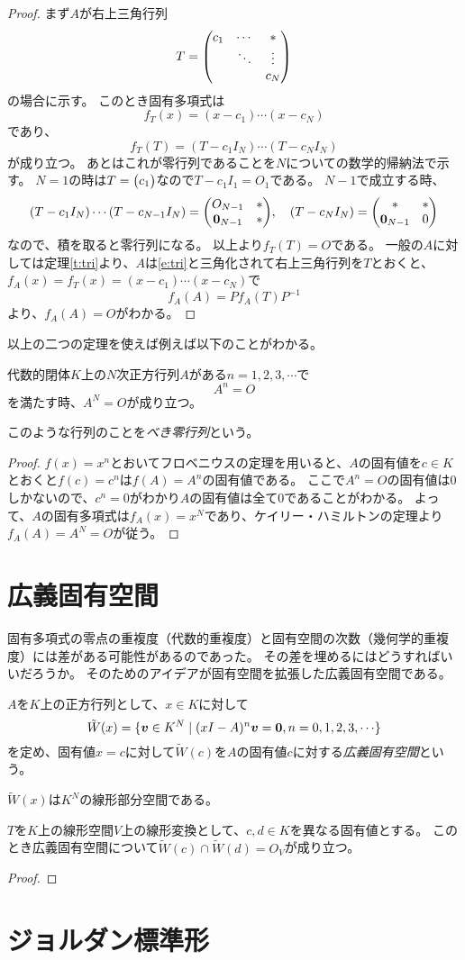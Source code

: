 \begin{proof}
まず$A$が右上三角行列
$$
T = \mqty(c_1 & \cdots & * \\ & \ddots & \vdots \\ & & c_N)
$$
の場合に示す。
このとき固有多項式は
$$
f_T(x) = (x-c_1)\cdots(x-c_N)
$$
であり、
$$
f_T(T) = (T-c_1 I_N)\cdots(T-c_N I_N)
$$
が成り立つ。
あとはこれが零行列であることを$N$についての数学的帰納法で示す。
$N = 1$の時は$T = \mqty(c_1)$なので$T-c_1 I_1 = O_1$である。
$N-1$で成立する時、
$$
(T-c_1 I_N)\cdots(T-c_{N-1} I_N) = \mqty(O_{N-1} & * \\ \vb*{0}_{N-1} & *),
\quad (T-c_N I_N) = \mqty(* & * \\ \vb*{0}_{N-1} & 0)
$$
なので、積を取ると零行列になる。
以上より$f_T(T) = O$である。
一般の$A$に対しては定理\ref{t:tri}より、$A$は\eqref{e:tri}と三角化されて右上三角行列を$T$とおくと、
$f_A(x) = f_T(x) = (x-c_1)\cdots(x-c_N)$で
$$
f_A(A) = P f_A(T) P^{-1}
$$
より、$f_A(A) = O$がわかる。
\end{proof}

以上の二つの定理を使えば例えば以下のことがわかる。

\begin{proposition}[べき零行列]
代数的閉体$K$上の$N$次正方行列$A$がある$n = 1, 2, 3, \cdots$で
$$
A^n = O
$$
を満たす時、$A^N = O$が成り立つ。
\end{proposition}

このような行列のことを\emph{べき零行列}という。

\begin{proof}
$f(x) = x^n$とおいてフロベニウスの定理を用いると、$A$の固有値を$c \in K$とおくと$f(c) = c^n$は$f(A) = A^n$の固有値である。
ここで$A^n = O$の固有値は$0$しかないので、$c^n = 0$がわかり$A$の固有値は全て$0$であることがわかる。
よって、$A$の固有多項式は$f_A(x) = x^N$であり、ケイリー・ハミルトンの定理より$f_A(A) = A^N = O$が従う。
\end{proof}

\section{広義固有空間}

固有多項式の零点の重複度（代数的重複度）と固有空間の次数（幾何学的重複度）には差がある可能性があるのであった。
その差を埋めるにはどうすればいいだろうか。
そのためのアイデアが固有空間を拡張した広義固有空間である。

\begin{definition}[広義固有空間]
$A$を$K$上の正方行列として、$x \in K$に対して
$$
\tilde{W}(x) = \lrset{ \vb*{v} \in K^N \mid (x I-A)^n\vb*{v} = \vb*{0}, n = 0, 1, 2, 3, \cdots }
$$
を定め、固有値$x = c$に対して$\tilde{W}(c)$を$A$の固有値$c$に対する\emph{広義固有空間}という。
\end{definition}

$\tilde{W}(x)$は$K^N$の線形部分空間である。

\begin{lemma}[広義固有空間の線形独立性]
$T$を$K$上の線形空間$V$上の線形変換として、$c, d \in K$を異なる固有値とする。
このとき広義固有空間について$\tilde{W}(c)\cap \tilde{W}(d) = O_V$が成り立つ。
\end{lemma}

\begin{proof}
\end{proof}

\section{ジョルダン標準形}

